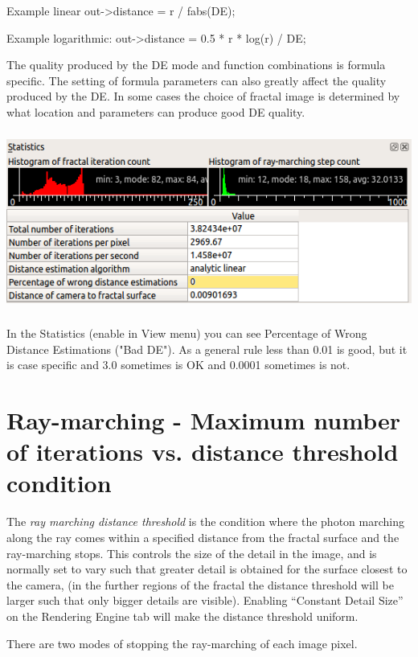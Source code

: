 Example linear out-\textgreater{}distance = r / fabs(DE);

Example logarithmic: out-\textgreater{}distance = 0.5 * r * log(r) / DE;

The quality produced by the DE mode and function combinations is formula
specific. The setting of formula parameters can also greatly affect the
quality produced by the DE. In some cases the choice of fractal image is
determined by what location and parameters can produce good DE quality.

\includegraphics[width=5.71890in,height=2.32283in]{img/manual/media/image7.png}

In the Statistics (enable in View menu) you can see Percentage of Wrong
Distance Estimations ("Bad DE"). As a general rule less than 0.01 is
good, but it is case specific and 3.0 sometimes is OK and 0.0001
sometimes is not.

\hypertarget{ray-marching---maximum-number-of-iterations-vs.-distance-threshold-condition}{\section{Ray-marching
- Maximum number of iterations vs. distance threshold
condition}\label{ray-marching---maximum-number-of-iterations-vs.-distance-threshold-condition}}

The \emph{ray marching distance threshold} is the condition where the
photon marching along the ray comes within a specified distance from the
fractal surface and the ray-marching stops. This controls the size of
the detail in the image, and is normally set to vary such that greater
detail is obtained for the surface closest to the camera, (in the
further regions of the fractal the distance threshold will be larger
such that only bigger details are visible). Enabling ``Constant Detail
Size'' on the Rendering Engine tab will make the distance threshold
uniform.

There are two modes of stopping the ray-marching of each image pixel.

